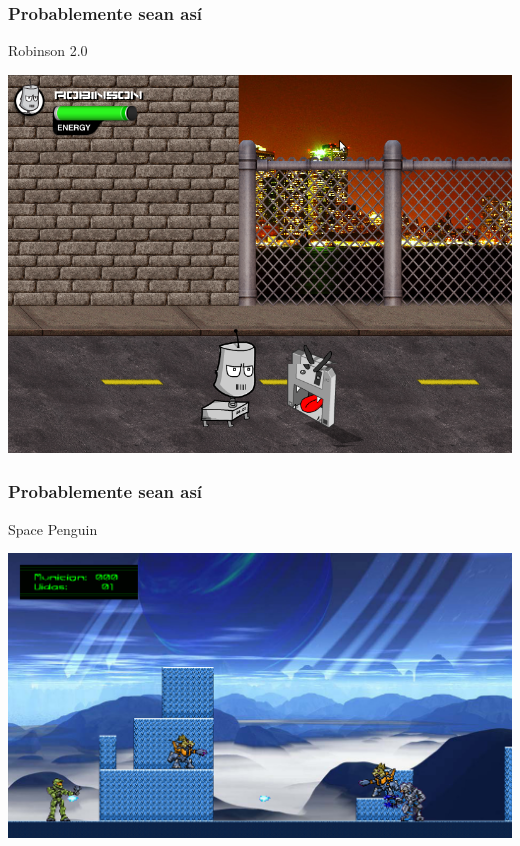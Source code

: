 \documentclass{beamer}
\begin{document}
\begin{frame}
	\frametitle{Probablemente sean así}

	\begin{center}
	Robinson 2.0
	
	    \includegraphics[scale=0.3]{img/robinson.png}
	\end{center}
\end{frame}

\begin{frame}
	\frametitle{Probablemente sean así}

	\begin{center}
	Space Penguin
	
	    \includegraphics[scale=0.3]{img/spacepenguin.png}
	\end{center}
\end{frame}
\end{document}
